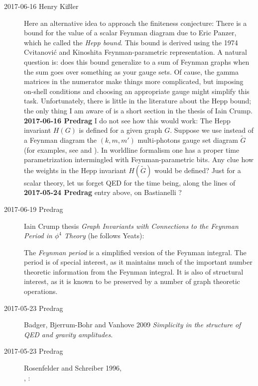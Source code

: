 \begin{description}
\item[2017-06-16 Henry Ki{\ss}ler]
 \label{sect:Hepp}
Here an alternative idea to approach the finiteness conjecture: There is
a bound for the value of a scalar Feynman diagram due to Eric Panzer,
which he called the \emph{Hepp bound}. This bound is derived using the 1974
Cvitanovi{\'c} and Kinoshita Feynman-parametric
representation. A natural question is: does this bound generalize to a
sum of Feynman graphs when the sum goes over something as your gauge
sets. Of cause, the gamma matrices in the numerator make things more
complicated, but imposing on-shell conditions and choosing an appropriate
gauge might simplify this task. Unfortunately, there is little in the
literature about the Hepp bound; the only thing I am aware
of is a short section in the
{thesis} of Iain Crump.
\\{\bf 2017-06-16 Predrag}
I do not see how this would work: The Hepp invariant $H(G)$ is defined
for a given graph $G$. Suppose we use instead of a Feynman diagram the
$(k,m,m')$ multi-photons gauge set diagram $\tilde{G}$ (for examples, see
 and ). In worldline formalism
one has a proper time parametrization intermingled with
Feynman-parametric bits. Any clue how the weights in the Hepp invariant
$H(\tilde{G})$ would be defined? Just for a scalar theory, let us forget QED
for the time being, along the lines of
{\bf 2017-05-24 Predrag} entry above, on Bastianelli \etal{}?

\item[2017-06-19 Predrag]
Iain Crump
{thesis} {\em Graph Invariants with Connections to the
Feynman Period in $\phi^4$ Theory} (he follows Yeats):

The \emph{Feynman period} is a simplified version of the Feynman integral. The
period is of special interest, as it maintains much of the important
number theoretic information from the Feynman integral. It is also of
structural interest, as it is known to be preserved by a number of graph
theoretic operations.


\item[2017-05-23 Predrag]
Badger, Bjerrum-Bohr and Vanhove 2009
{\em Simplicity in the structure of {QED} and gravity amplitudes}.

\item[2017-05-23 Predrag]
Rosenfelder and Schreiber 1996,
\\
, :


\end{description}
